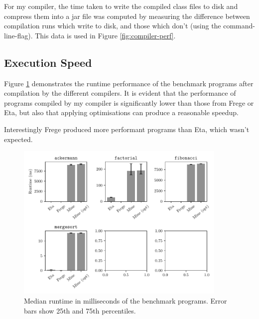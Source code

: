 \documentclass[dissertation.tex]{subfiles}
\begin{document}
{{        For my compiler, the time taken to write the compiled class files to disk and compress them into a jar file was computed by measuring the difference between compilation runs which write to disk, and those which don't (using the  command-line-flag). This data is used in Figure \ref{fig:compiler-perf}.
    }
    \subsection{Execution Speed}
    {

        Figure \ref{fig:perf} demonstrates the runtime performance of the benchmark programs after compilation by the different compilers. It is evident that the performance of programs compiled by my compiler is significantly lower than those from Frege or Eta, but also that applying optimisations can produce a reasonable speedup.

        Interestingly Frege produced more performant programs than Eta, which wasn't expected.

        \begin{figure}[h]
            \centering
            \captionsetup{width=0.8\textwidth}
            \includegraphics[width=0.9\textwidth]{graphs/perf.pdf}
            \caption{Median runtime in milliseconds of the benchmark programs. Error bars show 25th and 75th percentiles.}
            \label{fig:perf}
        
        \end{figure}

}}
\end{document}
